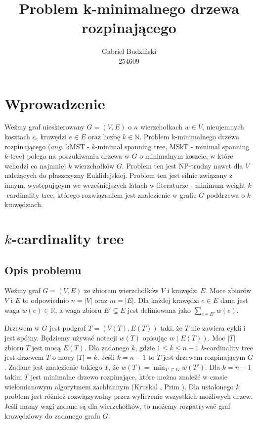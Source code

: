 \documentclass[12pt]{article}
\title{Problem k-minimalnego drzewa rozpinającego}
\author{Gabriel Budziński\\254609}
\begin{document}
\maketitle

\section{Wprowadzenie}

Weźmy graf nieskierowany $G=(V,E)$ o $n$ wierzchołkach $w \in V$, nieujemnych kosztach $c_e$ krawędzi $e \in E$ oraz liczbę $k \in \mathbb{N}$. Problem k-minimalnego drzewa rozpinającego ($\textit{ang.}$ kMST - $k$-minimal spanning tree, MSkT - minimal spanning $k$-tree) polega na poszukiwaniu drzewa w $G$ o minimalnym koszcie, w które wchodzi co najmniej $k$ wierzchołków $G$. Problem ten jest NP-trudny nawet dla $V$ należących do płaszczyzny Euklidejskiej. Problem ten jest silnie związany z innym, występującym we wcześniejszych latach w literaturze \cite{k_card_trees} - minimum weight $k$-cardinality tree, którego rozwiązaniem jest znalezienie w grafie $G$ poddrzewa o $k$ krawędziach.

\section{$k$-cardinality tree}

\subsection{Opis problemu}
Weźmy graf $G = (V,E)$ ze zbiorem wierzchołków $V$ i krawędzi $E$. Moce zbiorów $V$ i $E$ to odpowiednio $n = |V|$ oraz $m = |E|$. Dla każdej krawędzi $e \in E$ dana jest waga $w(e) \in \mathbb{R}$, a waga zbioru $E' \subseteq E$ jest definiowana jako $\sum_{e \in E'}{w(e)}$.

Drzewem w $G$ jest podgraf $T = (V(T), E(T))$ taki, że $T$ nie zawiera cykli i jest spójny. Będziemy używać notacji $w(T)$ opisując $w(E(T))$. Moc $|T|$ zbioru $T$ jest mocą $E(T)$. Dla zadanego $k$, gdzie $1 \leq k \leq n-1$ $k$-cardinality tree jest drzewem $T$ o mocy $|T| = k$. Jeśli $k = n-1$ to $T$ jest drzewem rozpinającym $G$. Zadane jest znalezienie takiego $T$, że $w(T) = \min_{T' \subseteq G}{w(T')}$. Dla $k = n-1$ takim $T$ jest minimalne drzewo rozpinające, które można znaleźć w czasie wielomianowym algorytmem zachłannym (Kruskal \cite{kruskal}, Prim \cite{prim}). Dla ustalonego $k$ problem jest różnież rozwiązywalny przez wyliczenie wszystkich możliwych drzew. Jeśli mamy wagi zadane są dla wierzchołków, to możemy rozpatrywać graf krawędziowy do zadanego grafu $G$.
\end{document}
